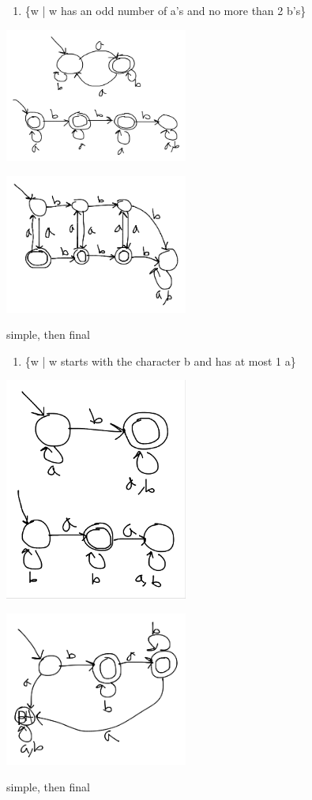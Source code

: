 \documentclass[letterpaper, 12pt]{article}
\begin{document}
\begin{enumerate}
\item \{w | w has an odd number of a's and no more than 2 b's\}
\end{enumerate}
\begin{center}
\includegraphics[width=6cm]{hw2/simple1-2.png}
\end{center}
\begin{center}
\includegraphics[width=6cm]{hw2/1-2.png}
\end{center}
simple, then final

\begin{enumerate}
\item \{w | w starts with the character b and has at most 1 a\}
\end{enumerate}
\begin{center}
\includegraphics[width=6cm]{hw2/simple1-3.png}
\end{center}
\begin{center}
\includegraphics[width=6cm]{hw2/1-3.png}
\end{center}
simple, then final
\end{document}
